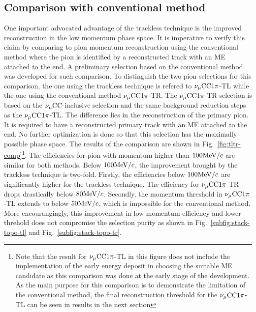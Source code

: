      \subsection{Comparison with conventional method}
          One important advocated advantage of the trackless technique is the improved reconstruction in the low momentum phase space.
          It is imperative to verify this claim by comparing to pion momentum reconstruction using the conventional method where the pion is identified by a reconstructed track with an ME attached to the end.
          A preliminary selection based on the conventional method was developed for such comparison.
          To distinguish the two pion selections for this comparison, the one using the trackless technique is refered to $\nu_{\mu}\textrm{CC}1\pi$-TL while the one using the conventional method $\nu_{\mu}\textrm{CC}1\pi$-TR.
          The $\nu_{\mu}\textrm{CC}1\pi$-TR selection is based on the $\nu_{\mu}\textrm{CC}$-inclusive selection and the same background reduction steps as the $\nu_{\mu}\textrm{CC}1\pi$-TL.
          The difference lies in the reconstruction of the primary pion.
          It is required to have a reconstructed primary track with an ME attached to the end.
          No further optimization is done so that this selection has the maximally possible phase space.
          The results of the comparison are shown in Fig.~\ref{fig:tltr-comp}\footnote{Note that the result for $\nu_{\mu}\textrm{CC}1\pi$-TL in this figure does not include the implementation of the early energy deposit in choosing the suitable ME candidate as this comparison was done at the early stage of the development.
          As the main purpose for this comparison is to demonstrate the limitation of the conventional method, the final reconstruction threshold for the $\nu_{\mu}\textrm{CC}1\pi$-TL can be seen in results in the next section}.
          The efficiencies for pion with momentum higher than $100\textrm{MeV}/c$ are similar for both methods.
          Below $100\textrm{MeV}/c$, the improvement brought by the trackless technique is two-fold.
          Firstly, the efficiencies below $100\textrm{MeV}/c$ are significantly higher for the trackless technique.
          The efficiency for $\nu_{\mu}\textrm{CC}1\pi$-TR drops drastically below $80\textrm{MeV}/c$.
          Secondly, the momentum threshold in $\nu_{\mu}\textrm{CC}1\pi$-TL extends to below $50\textrm{MeV}/c$, which is impossible for the conventional method.
          More encourangingly, this improvement in low momentum efficiency and lower threhold does not compromise the selection purity as shown in Fig.~\ref{subfig:stack-topo-tl} and Fig.~\ref{subfig:stack-topo-tr}.
